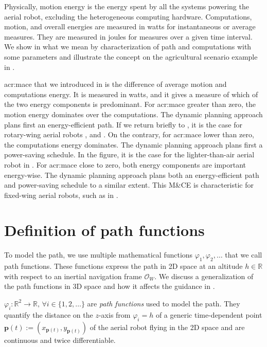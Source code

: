 Physically, motion energy is the energy spent by all the systems powering the aerial robot, excluding the heterogeneous computing hardware. Computations, motion, and overall energies are measured in watts for instantaneous or average measures. They are measured in joules for measures over a given time interval. We show in  what we mean by characterization of path and computations with some parameters and illustrate the concept on the agricultural scenario example in . 

\Gls{acr:mace} that we introduced in  is the difference of average motion and computations energy. It is measured in watts, and it gives a measure of which of the two energy components is predominant. For \Gls{acr:mace} greater than zero, the motion energy dominates over the computations. The dynamic planning approach plans first an energy-efficient path. If we return briefly to , it is the case for rotary-wing aerial robots , and . On the contrary, for \Gls{acr:mace} lower than zero, the computations energy dominates. The dynamic planning approach plans first a power-saving schedule. In the figure, it is the case for the lighter-than-air aerial robot  in . For \Gls{acr:mace} close to zero, both energy components are important energy-wise. The dynamic planning approach plans both an energy-efficient path and power-saving schedule to a similar extent. This M\&CE is characteristic for fixed-wing aerial robots, such as  in .


\section{Definition of path functions}
\label{sec:path-functions}

To model the path, we use multiple mathematical functions $\varphi_1,\varphi_2,\dots$ that we call path functions. These functions express the path in 2D space at an altitude $h\in\mathbb{R}$ with respect to an inertial navigation frame $\mathcal{O}_W$. We discuss a generalization of the path functions in 3D space and how it affects the guidance in . 

\begin{highlight}
  \begin{defn}\label{def:paths}
    $\varphi_i:\mathbb{R}^2\rightarrow\mathbb{R},\,\forall i\in\{1,2,\dots\}$ are \emph{path functions} used to model the path. They quantify the distance on the $z$-axis from $\varphi_i=h$ of a generic time-dependent point $\mathbf{p}(t):=(x_{\mathbf{p}(t)},y_{\mathbf{p}(t)})$ of the aerial robot flying in the 2D space and are continuous and twice differentiable. 
  \end{defn}
\end{highlight}

